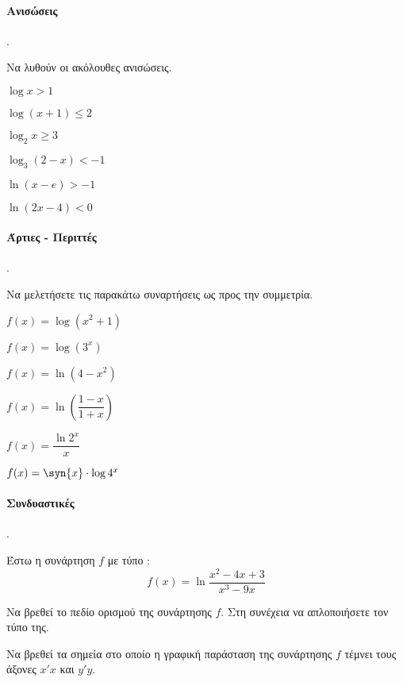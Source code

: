 \documentclass[11pt,a4paper,twocolumn]{article}
\newcounter{askhsh}
\newcommand{\askhsh}{\large\theaskhsh.\ \addtocounter{askhsh}{1}}
\begin{document}
\paragraph{Ανισώσεις}
\askhsh Να λυθούν οι ακόλουθες ανισώσεις.
\begin{multicols}{2}
\begin{alist}
\item $\log{x}>1$
\item $\log{(x+1)}\leq 2$
\item $\log_2{x}\geq 3$
\item $\log_3{(2-x)}<-1$
\item $\ln{(x-e)}>-1$
\item $\ln{(2x-4)}<0$
\end{alist}
\end{multicols}
\paragraph{Άρτιες - Περιττές}
\askhsh Να μελετήσετε τις παρακάτω συναρτήσεις ως προς την συμμετρία.
\begin{multicols}{2}
\begin{alist}[leftmargin=6mm]
\item $f(x)=\log{\left(x^2+1\right)}$
\item $f(x)=\log{\left(3^x\right)}$
\item $f(x)=\ln{(4-x^2)}$
\item $f(x)=\ln\left(\dfrac{1-x}{1+x}\right)$
\item $f(x)=\dfrac{\ln{2^x}}{x}$
\item $f(x)=\syn{x}\cdot\log{4^x}$
\end{alist}
\end{multicols}
\paragraph{Συνδυαστικές}
\askhsh Έστω η συνάρτηση $ f $ με τύπο :
\[ f(x)=\ln\frac{x^2-4x+3}{x^3-9x} \]
\begin{alist}
\item Να βρεθεί το πεδίο ορισμού της συνάρτησης $ f $. Στη συνέχεια να απλοποιήσετε τον τύπο της.
\item Να βρεθεί τα σημεία στο οποίο η γραφική παράσταση της συνάρτησης $ f $ τέμνει τους άξονες $x'x$ και $ y'y $.
\item 
\end{alist}
\end{document}
